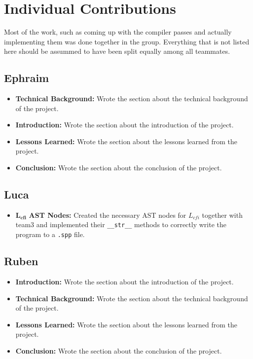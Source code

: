 \section{Individual Contributions}
Most of the work, such as coming up with the compiler passes and actually implementing them was done together in the group. Everything that is not listed here should be assummed
to have been split equally among all teammates.
\subsection{Ephraim}

\begin{itemize}
    \item \textbf{Technical Background:} Wrote the section about the technical background of the project.
    \item \textbf{Introduction:} Wrote the section about the introduction of the project.
    \item \textbf{Lessons Learned:} Wrote the section about the lessons learned from the project.
    \item \textbf{Conclusion:} Wrote the section about the conclusion of the project.
\end{itemize}

\subsection{Luca}

\begin{itemize}
    \item $\mathbf{L_{cfi}}$\textbf{ AST Nodes:} Created the necessary AST nodes for $L_{cfi}$ together with team3 and implemented their \texttt{\_\_str\_\_} methods to correctly write the program to a \texttt{.spp} file.
\end{itemize}

\subsection{Ruben}

\begin{itemize}
    \item \textbf{Introduction:} Wrote the section about the introduction of the project.
    \item \textbf{Technical Background:} Wrote the section about the technical background of the project.
    \item \textbf{Lessons Learned:} Wrote the section about the lessons learned from the project.
    \item \textbf{Conclusion:} Wrote the section about the conclusion of the project.
\end{itemize}

